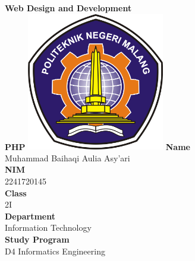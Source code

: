 \documentclass[12pt,titlepage]{article}
\newcommand{\vSubject}{Web Design and Development}
\newcommand{\vSubtitle}{PHP}
\newcommand{\vName}{Muhammad Baihaqi Aulia Asy'ari}
\newcommand{\vNIM}{2241720145}
\newcommand{\vClass}{2I}
\newcommand{\vDepartment}{Information Technology}
\newcommand{\vStudyProgram}{D4 Informatics Engineering}
\begin{document}
\begin{titlepage}
    \centering
    \vfill
    {\bfseries\LARGE
        \vSubject\\
        \vskip0.25cm
        \vSubtitle
    }
    \vfill
    \includegraphics[width=6cm]{images/polinema-logo.png}
    \vfill
    {
        \textbf{Name}\\
        \vName\\
        \vskip0.5cm
        \textbf{NIM}\\
        \vNIM\\
        \vskip0.5cm
        \textbf{Class}\\
        \vClass\\
        \vskip0.5cm
        \textbf{Department}\\
        \vDepartment\\
        \vskip0.5cm
        \textbf{Study Program}\\
        \vStudyProgram
    }
\end{titlepage}

\newpage
\end{document}
